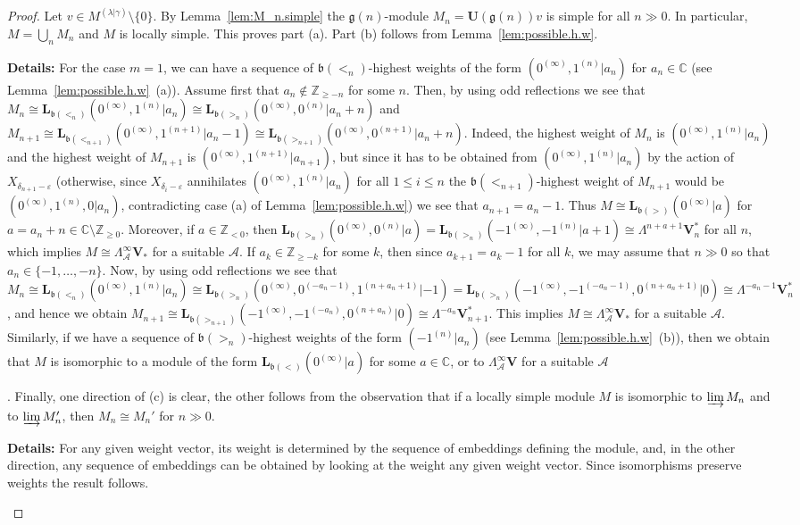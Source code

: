 \documentclass[12pt]{amsart}
\newcommand\C{\mathbb{C}}
\newcommand\Z{\mathbb{Z}}
\newcommand\g{\mathfrak{g}}
\newcommand\fb{\mathfrak{b}}
\newcommand\cA{\mathcal{A}}
\newcommand\bV{\mathbf{V}}
\newcommand\bU{\mathbf{U}}
\newcommand\bL{\mathbf{L}}
\theoremstyle{plain}
\theoremstyle{definition}
\numberwithin{equation}{section}
\newcommand{\details}[1]{\smallskip \color{blue} \begin{footnotesize} \textbf{Details:} #1 \end{footnotesize} \color{black}}
\newcommand{\details}[1]{}
\begin{document}
\begin{proof}
Let $v\in M^{(\lambda | \gamma)}\setminus \{0\}$. By Lemma~\ref{lem:M_n.simple} the $\g(n)$-module $M_n = \bU(\g(n)) v$ is simple for all $n\gg 0$. In particular, $M = \bigcup_n M_n$ and $M$ is locally simple. This proves part (a). Part (b) follows from Lemma~\ref{lem:possible.h.w}. \details{For the case $m=1$, we can have a sequence of $\fb(<_n)$-highest weights of the form $(0^{(\infty)},1^{(n)}|a_n)$ for $a_n\in \C$ (see Lemma~\ref{lem:possible.h.w}~(a)). Assume first that $a_n\notin \Z_{\geq -n}$ for some $n$. Then, by using odd reflections we see that $M_n\cong \bL_{\fb(<_n)}(0^{(\infty)},1^{(n)}|a_n)\cong \bL_{\fb(>_{n})}(0^{(\infty)},0^{(n)}|a_n+n)$ and $M_{n+1}\cong \bL_{\fb(<_{n+1})}(0^{(\infty)},1^{(n+1)}|a_n-1)\cong \bL_{\fb(>_{n+1})}(0^{(\infty)},0^{(n+1)}|a_n+n)$. Indeed, the highest weight of $M_n$ is $(0^{(\infty)},1^{(n)}|a_n)$ and the highest weight of $M_{n+1}$ is $(0^{(\infty)},1^{(n+1)}|a_{n+1})$, but since it has to be obtained from $(0^{(\infty)},1^{(n)}|a_n)$ by the action of $X_{\delta_{n+1}-\varepsilon}$ (otherwise, since $X_{\delta_{i}-\varepsilon}$ annihilates $(0^{(\infty)},1^{(n)}|a_n)$ for all $1\leq i\leq n$ the $\fb(<_{n+1})$-highest weight of $M_{n+1}$ would be $(0^{(\infty)},1^{(n)},0|a_n)$, contradicting case (a) of Lemma~\ref{lem:possible.h.w}) we see that $a_{n+1}=a_n-1$. Thus $M\cong \bL_{\fb(>)}(0^{(\infty)}|a)$ for $a=a_n+n\in \C\setminus \Z_{\geq 0}$. Moreover, if $a\in \Z_{<0}$, then $\bL_{\fb(>_{n})}(0^{(\infty)},0^{(n)}|a)=\bL_{\fb(>_{n})}(-1^{(\infty)},-1^{(n)}|a+1)\cong \Lambda^{n+a+1}\bV_n^*$ for all $n$, which implies $M\cong \Lambda_\cA^{\infty} \bV_*$ for a suitable $\cA$. If $a_k\in \Z_{\geq -k}$ for some $k$, then since $a_{k+1}=a_k-1$ for all $k$, we may assume that $n\gg 0$ so that $a_n\in \{-1,\ldots, -n\}$. Now, by using odd reflections we see that $M_n\cong \bL_{\fb(<_n)}(0^{(\infty)},1^{(n)}|a_n)\cong \bL_{\fb(>_{n})}(0^{(\infty)},0^{(-a_n-1)},1^{(n+a_n+1)}|-1)= \bL_{\fb(>_{n})}(-1^{(\infty)},-1^{(-a_n-1)},0^{(n+a_n+1)}|0)\cong \Lambda^{-a_n-1}\bV_n^*$, and hence we obtain $M_{n+1}\cong \bL_{\fb(>_{n+1})}(-1^{(\infty)},-1^{(-a_n)},0^{(n+a_n)}|0) \cong \Lambda^{-a_n}\bV_{n+1}^*$. This implies $M\cong \Lambda_\cA^{\infty} \bV_*$ for a suitable $\cA$. Similarly, if we have a sequence of $\fb(>_n)$-highest weights of the form $(-1^{(n)}|a_n)$ (see Lemma~\ref{lem:possible.h.w}~(b)), then we obtain that $M$ is isomorphic to a module of the form $\bL_{\fb(<)}(0^{(\infty)}|a)$ for some $a\in \C$, or to $\Lambda_\cA^{\infty} \bV$ for a suitable $\cA$}. Finally, one direction of (c) is clear, the other follows from the observation that if a locally simple module $M$ is isomorphic to $\varinjlim M_n$ and to $\varinjlim M_n'$, then $M_n\cong M_n'$ for $n\gg 0$. \details{For any given weight vector, its weight is determined by the sequence of embeddings defining the module, and, in the other direction, any sequence of embeddings can be obtained by looking at the weight any given weight vector. Since isomorphisms preserve weights the result follows.}
\end{proof}
\end{document}
